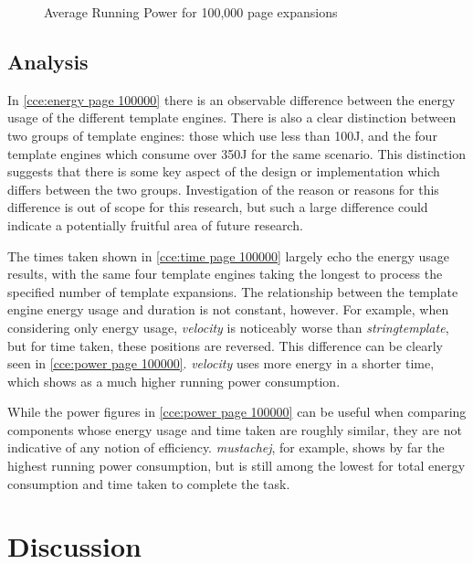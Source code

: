 \begin{figure}[htbp]
  \centering
  
  \caption{Average Running Power for 100,000 page expansions}
  \label{cce:power page 100000}
\end{figure}

\subsection{Analysis}
\label{cce analysis}

In \autoref{cce:energy page 100000} there is an observable difference between the energy usage of the different template engines. There is also a clear distinction between two groups of template engines: those which use less than 100J, and the four template engines which consume over 350J for the same scenario. This distinction suggests that there is some key aspect of the design or implementation which differs between the two groups. Investigation of the reason or reasons for this difference is out of scope for this research, but such a large difference could indicate a potentially fruitful area of future research.

The times taken shown in \autoref{cce:time page 100000} largely echo the energy usage results, with the same four template engines taking the longest to process the specified number of template expansions. The relationship between the template engine energy usage and duration is not constant, however. For example, when considering only energy usage, \emph{velocity} is noticeably worse than \emph{stringtemplate}, but for time taken, these positions are reversed. This difference can be clearly seen in \autoref{cce:power page 100000}. \emph{velocity} uses more energy in a shorter time, which shows as a much higher running power consumption.

While the power figures in \autoref{cce:power page 100000} can be useful when comparing components whose energy usage and time taken are roughly similar, they are not indicative of any notion of efficiency. \emph{mustachej}, for example, shows by far the highest running power consumption, but is still among the lowest for total energy consumption and time taken to complete the task.

\section{Discussion}
\label{ce duscussion}

